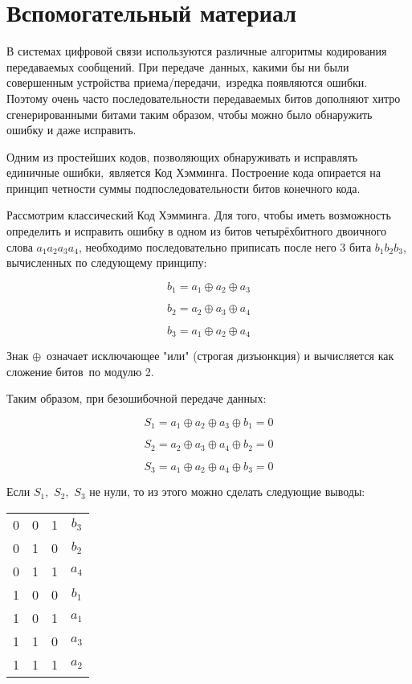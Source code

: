 \section*{Вспомогательный материал}

В системах цифровой связи используются различные алгоритмы кодирования передаваемых сообщений. При передаче данных, какими бы ни были совершенным устройства приема/передачи, изредка появляются ошибки. Поэтому очень часто последовательности передаваемых битов дополняют хитро сгенерированными битами таким образом, чтобы можно было обнаружить ошибку и даже исправить.

Одним из простейших кодов, позволяющих обнаруживать и исправлять единичные ошибки, является Код Хэмминга. Построение кода опирается на принцип четности суммы подпоследовательности битов конечного кода.

Рассмотрим классический Код Хэмминга. Для того, чтобы иметь возможность определить и исправить ошибку в одном из битов четырёхбитного двоичного слова $a_1a_2a_3a_4$, необходимо последовательно приписать после него 3 бита $b_1b_2b_3$, вычисленных по следующему принципу:

$$b_1 = a_1 \oplus a_2 \oplus a_3 $$

$$b_2 = a_2 \oplus a_3 \oplus a_4 $$

$$b_3 = a_1 \oplus a_2 \oplus a_4 $$

Знак $\oplus$ означает исключающее "или" (строгая дизъюнкция) и вычисляется как сложение битов по модулю 2.

Таким образом, при безошибочной передаче данных:

$$S_1 = a_1 \oplus a_2 \oplus a_3 \oplus b_1 = 0 $$

$$S_2 = a_2 \oplus a_3 \oplus a_4 \oplus b_2 = 0 $$

$$S_3 = a_1 \oplus a_2 \oplus a_4 \oplus b_3 = 0 $$

Если $S_1$, $S_2$, $S_3$ не нули, то из этого можно сделать следующие выводы:

\begin{tabular}{c c c c}
    0 & 0 & 1 & $b_3$ \\
    0 & 1 & 0 & $b_2$ \\
    0 & 1 & 1 & $a_4$ \\
    1 & 0 & 0 & $b_1$ \\
    1 & 0 & 1 & $a_1$ \\
    1 & 1 & 0 & $a_3$ \\
    1 & 1 & 1 & $a_2$ \\
\end{tabular}

